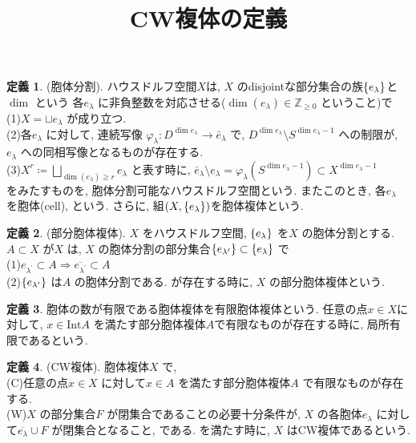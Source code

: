 \documentclass[10pt, fleqn, label-section=none]{bxjsarticle}
\title{CW複体の定義}
\date{}
\author{}
\theoremstyle{definition}
\newtheorem{dfn}{定義}[section]
\newcommand{\cbra}[1]{\mleft\{#1\mright\}}
\newcommand{\naraba}{\Rightarrow}
\renewcommand{\;}{\, ; \,}
\begin{document}
\maketitle



\section{}


\begin{dfn} (胞体分割).
ハウスドルフ空間$X$は, $X$ のdisjointな部分集合の族$\cbra{e_\lambda}$と$\dim$ という 各$e_\lambda$ に非負整数を対応させる($\dim(e_\lambda) \in \mathbb Z _{\geq 0}$ ということ)で\\
(1)$X = \sqcup e_\lambda$ が成り立つ. \\
(2)各$e_\lambda$ に対して, 連続写像 $\varphi_\lambda : D^{\dim e_\lambda} \rightarrow \bar e_\lambda$ で, $D^ {\dim e_\lambda} \setminus S^{\dim e_\lambda -1}$ への制限が, $e_\lambda$ への同相写像となるものが存在する. \\
(3)$X^r \coloneqq \displaystyle \bigsqcup_{\dim(e_\lambda) \geq r} e_\lambda$ と表す時に, $\bar e_\lambda \setminus e_\lambda = \varphi_\lambda (S^{\dim e_\lambda - 1}) \subset X^{\dim e_\lambda -1}$ \\
をみたすものを, 胞体分割可能なハウスドルフ空間という. またこのとき, 各$e_\lambda$ を胞体(cell), という. さらに, 組$(X, \cbra{e_\lambda})$を胞体複体という. 
\end{dfn}

\begin{dfn}(部分胞体複体). $X$ をハウスドルフ空間, $\cbra{e_\lambda}$ を$X$ の胞体分割とする. $A \subset X$ が$X$ は, $X$ の胞体分割の部分集合$\cbra{  e_{\lambda^\prime }  } \subset \cbra{e_\lambda}$ で\\
($1$)$e_{\lambda^\prime }  \subset A \naraba \overline{e_{\lambda^\prime } } \subset A $ \\
($2$)$\cbra{  e_{\lambda^\prime }  }$ は$A$ の胞体分割である.
が存在する時に, $X$ の部分胞体複体という. 
\end{dfn}

\begin{dfn}
胞体の数が有限である胞体複体を有限胞体複体という. 任意の点$x \in X$に対して, $x \in \textrm{Int} A$ を満たす部分胞体複体$A$で有限なものが存在する時に, 局所有限であるという. 
\end{dfn}

\begin{dfn}(CW複体).
胞体複体$X$ で, \\
(C)任意の点$x \in X$ に対して$x \in  A$ を満たす部分胞体複体$A$ で有限なものが存在する. \\
(W)$X$ の部分集合$F$ が閉集合であることの必要十分条件が, $X$ の各胞体$e_\lambda$ に対して$\overline{e_\lambda} \cup F$ が閉集合となること, である.
を満たす時に, $X$ はCW複体であるという. 
\end{dfn}
\end{document}
